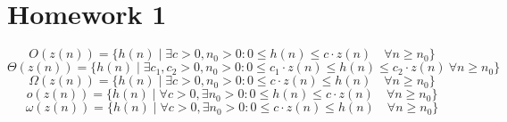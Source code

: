 \documentclass[10pt,a4paper,oneside]{report}
\author{Patrick Kalmbach}
\begin{document}
\noindent
\section{Homework 1}
\begin{equation}\label{eq:bigo}
O(z(n))=\lbrace h(n)\mid\exists c>0,n_{0}>0:0\leq h(n)\leq c\cdot z(n)\quad\forall n\geq n_{0}\rbrace
\end{equation}
\begin{equation}\label{eq:bigtheta}
\Theta(z(n))=\lbrace h(n)\mid\exists c_{1},c_{2}>0,n_{0}>0:0\leq c_{1}\cdot z(n)\leq h(n)\leq c_{2}\cdot z(n)\ \forall n\geq n_{0}\rbrace
\end{equation}
\begin{equation}\label{eq:bigomega}
\Omega(z(n))=\lbrace h(n)\mid\exists c>0,n_{0}>0:0\leq c\cdot z(n)\leq h(n)\quad\forall n\geq n_{0}\rbrace
\end{equation}
\begin{equation}\label{eq:smallo}
o(z(n))=\lbrace h(n)\mid\forall c>0,\exists n_{0}>0:0\leq h(n)\leq c\cdot z(n)\quad\forall n\geq n_{0}\rbrace
\end{equation}
\begin{equation}\label{eq:smallomega}
\omega(z(n))=\lbrace h(n)\mid\forall c>0,\exists n_{0}>0:0\leq c\cdot z(n)\leq h(n)\quad\forall n\geq n_{0}\rbrace
\end{equation}
\end{document}
